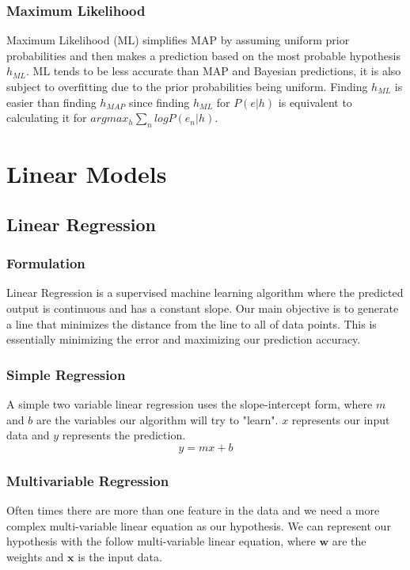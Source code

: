 \documentclass[12pt]{article}
\begin{document}
    \subsubsection{Maximum Likelihood}
        Maximum Likelihood (ML) simplifies MAP by assuming uniform prior probabilities and then makes a prediction based on the most probable hypothesis $h_{ML}$. ML tends to be less accurate than MAP and Bayesian predictions, it is also subject to overfitting
        due to the prior probabilities being uniform. Finding $h_{ML}$ is easier than finding $h_{MAP}$ since finding $h_{ML}$ for $P(e|h)$ is equivalent to calculating it for $argmax_h \sum_n logP(e_n |h)$.

\section{Linear Models}
    \subsection{Linear Regression}
    \subsubsection{Formulation}
        Linear Regression is a supervised machine learning algorithm where the predicted output is continuous and has a constant slope. Our main objective is to generate a line that
        minimizes the distance from the line to all of data points. This is essentially minimizing the error and maximizing our prediction accuracy.
    
    \subsubsection{Simple Regression}
        A simple two variable linear regression uses the slope-intercept form, where $m$ and $b$ are the variables our algorithm will try to "learn". $x$ represents our input data
        and $y$ represents the prediction.
        $$ y = mx + b$$

    \subsubsection{Multivariable Regression}
        Often times there are more than one feature in the data and we need a more complex multi-variable linear equation as our hypothesis. We can represent our hypothesis with the
        follow multi-variable linear equation, where $\boldsymbol{w}$ are the weights and $\boldsymbol{x}$ is the input data.
\end{document}
